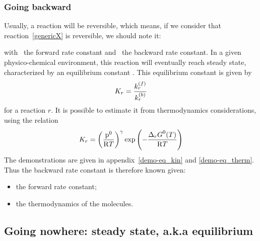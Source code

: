 \subsubsection{Going backward}

Usually, a reaction will be reversible, which means, if we consider
that reaction~\ref{genericX} is reversible, we should note it:
\begin{chemicalEquation}
\label{genericXrev}
\end{chemicalEquation}
with \fwdratecons\ the forward rate constant and \bkwdratecons\ the backward rate constant.
In a given physico-chemical environment, this reaction will eventually reach
steady state, characterized by an equilibrium constant \Eqconst. 
This equilibrium constant is given by
\begin{equation}
\Eqconst[r] = \frac{\fwdratecons[r]}{\bkwdratecons[r]}
\label{therm:K_kin}
\end{equation}
for a reaction $r$.
It is possible to estimate it from thermodynamics considerations, 
using the relation
\begin{equation}
\Eqconst[r] = \left(\frac{\pz}{\Rg \Temp}\right)^\gamma \exp\left(-\frac{\DGibbsZ[r](\Temp)}{\Rg \Temp}\right)
\label{therm:K_therm}
\end{equation}
The demonstrations are given in appendix~\ref{demo-eq_kin} and \ref{demo-eq_therm}. 
Thus the backward rate constant is therefore known given:
\begin{itemize}
\item the forward rate constant;
\item the thermodynamics of the molecules.
\end{itemize}

\subsection{Going nowhere: steady state, a.k.a equilibrium}

